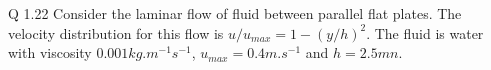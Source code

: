 
\begin{question}
  Q 1.22 Consider the laminar flow of fluid between parallel flat plates. The velocity distribution for this flow is $u/u_{max} = 1 - (y/h)^2$. The fluid is water with viscosity $0.001 \si{kg.m^{-1}s^{-1}}$, $u_{max} = 0.4 \si{m.s^{-1}}$ and $h = 2.5 \si{mn}$.
\end{question}



















